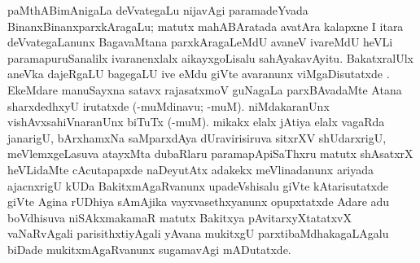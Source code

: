 paMthABimAnigaLa deVvategaLu nijavAgi paramadeYvada BinanxBinanxparxkAragaLu; matutx mahABAratada avatAra kalapxne I itara deVvategaLanunx BagavaMtana parxkAragaLeMdU avaneV ivareMdU heVLi paramapuruSanalilx ivaranenxlalx aikayxgoLisalu sahAyakavAyitu. BakatxralUlx aneVka dajeRgaLU bagegaLU ive eMdu giVte avaranunx viMgaDisutatxde . EkeMdare manuSayxna satavx rajasatxmoV guNagaLa parxBAvadaMte Atana sharxdedhxyU irutatxde (-muMdinavu; -muM). niMdakaranUnx vishAvxsahiVnaranUnx biTuTx (-muM). mikakx elalx jAtiya elalx vagaRda janarigU, bArxhamxNa saMparxdAya dUravirisiruva sitxrXV shUdarxrigU, meVlemxgeLasuva atayxMta dubaRlaru paramapApiSaThxru matutx shAsatxrX heVLidaMte cAcutapapxde naDeyutAtx adakekx meVlinadanunx ariyada ajacnxrigU kUDa BakitxmAgaRvanunx upadeVshisalu giVte kAtarisutatxde  giVte Agina rUDhiya sAmAjika vayxvasethxyanunx opupxtatxde  Adare adu boVdhisuva niSAkxmakamaR matutx Bakitxya pAvitarxyXtatatxvX vaNaRvAgali parisithxtiyAgali yAvana mukitxgU parxtibaMdhakagaLAgalu biDade mukitxmAgaRvanunx sugamavAgi mADutatxde.


